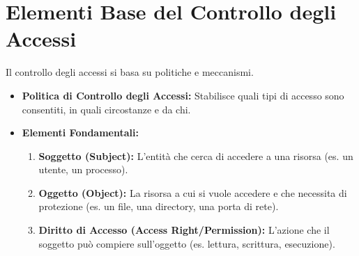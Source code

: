 \documentclass{article}
\begin{document}
\section{Elementi Base del Controllo degli Accessi}
Il controllo degli accessi si basa su politiche e meccanismi.
\begin{itemize}
    \item \textbf{Politica di Controllo degli Accessi:} Stabilisce quali tipi di accesso sono consentiti, in quali circostanze e da chi.
    \item \textbf{Elementi Fondamentali:}
    \begin{enumerate}
        \item \textbf{Soggetto (Subject):} L'entità che cerca di accedere a una risorsa (es. un utente, un processo).
        \item \textbf{Oggetto (Object):} La risorsa a cui si vuole accedere e che necessita di protezione (es. un file, una directory, una porta di rete).
        \item \textbf{Diritto di Accesso (Access Right/Permission):} L'azione che il soggetto può compiere sull'oggetto (es. lettura, scrittura, esecuzione).
    \end{enumerate}
\end{itemize}
\end{document}
